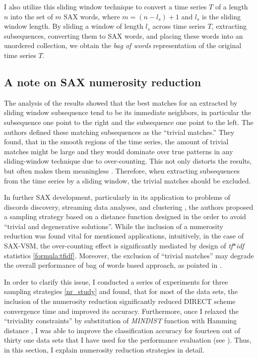 I also utilize this sliding window technique to convert a time series $T$ of a length $n$ into 
the set of $m$ SAX words, where $m=(n-l_{s})+1$ and $l_{s}$ is the sliding window length. 
By sliding a window of length $l_{s}$ across time series $T$, extracting subsequences, 
converting them to SAX words, and placing these words into an unordered collection, 
we obtain the \textit{bag of words} representation of the original time series $T$.


\subsection{A note on SAX numerosity reduction}\label{section_numerosity_reduction}
The analysis of the results showed that the best matches for an extracted by sliding window subsequence 
tend to be its immediate neighbors, in particular the subsequence one point to the right and the subsequence
one point to the left. The authors defined these matching subsequences as the “trivial matches.” 
They found, that in the smooth regions of the time series, the amount of trivial matches might be large and  
they would dominate over true patterns in any sliding-window technique due to over-counting. 
This not only distorts the results, but often makes them meaningless \cite{citeulike:227029}. 
Therefore, when extracting subsequences from the time series by a 
sliding window, the trivial matches should be excluded. 

In further SAX development, particularly in its application to problems of discords discovery,
streaming data analyses, and clustering \cite{citeulike:3175749} \cite{citeulike:532335}, the authors 
proposed a sampling strategy based on a distance function designed in the order to avoid 
``trivial and degenerative solutions''. 
While the inclusion of a numerosity reduction was found vital for mentioned applications, intuitively, 
in the case of SAX-VSM, the over-counting effect is significantly mediated by design of \textit{tf$\ast$idf}
statistics \eqref{formula:tfidf}. Moreover, the exclusion of ``trivial matches'' may degrade the overall performance 
of bag of words based approach, as pointed in \cite{citeulike:10525778}.

In order to clarify this issue, I conducted a series of experiments for three sampling strategies \ref{nr_study} and found, 
that for most of the data sets, the inclusion of the numerosity reduction significantly reduced DIRECT scheme convergence time 
and improved its accuracy. 
Furthermore, once I relaxed the ``triviality constraints'' by substitution of \textit{MINDIST} function \cite{citeulike:532335} 
with Hamming distance \cite{hamming}, I was able to improve the classification accuracy for fourteen out of thirty one 
data sets that I have used for the performance evaluation (see \cite{citeulike:12563560}). Thus, in this section, I explain 
numerosity reduction strategies in detail.

